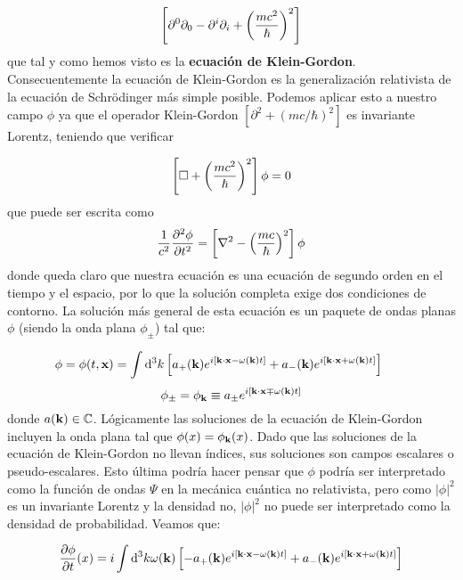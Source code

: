 \begin{equation}
	\left[ \partial^0\partial_0 - \partial^i \partial_i+ \left( \frac{mc^2}{\hbar} \right)^2  \right]
\end{equation}
que tal y como hemos visto es la \textbf{ecuación de Klein-Gordon}. Consecuentemente la ecuación de Klein-Gordon es la generalización relativista de la ecuación de Schrödinger más simple posible. Podemos aplicar esto a nuestro campo $\phi$ ya que el operador Klein-Gordon $[\partial^2 + (mc/\hbar)^2]$ es invariante Lorentz, teniendo que verificar

\begin{equation}
	\left[ \square + \left( \frac{mc^2}{\hbar} \right)^2  \right] \phi = 0
\end{equation}
que puede ser escrita como
\begin{equation}
	\frac{1}{c^2} \frac{\partial ^2 \phi}{\partial t^2}  = \left[ \nabla^2 - \left( \frac{mc}{\hbar} \right)^2 \right]\phi
\end{equation}
donde queda claro que nuestra ecuación es una ecuación de segundo orden en el tiempo y el espacio, por lo que la solución completa exige dos condiciones de contorno. La solución más general de esta ecuación es un paquete de ondas planas $\phi$ (siendo la onda plana $\phi_\pm$) tal que:

\begin{equation}
	\phi = \phi(t,\mathbf{x}) = \int \mathrm{d}^3 k\left[  a_+(\mathbf{k}) e^{i[\mathbf{k} \cdot \mathbf{x} - \omega(\mathbf{k})t]} +a_-(\mathbf{k}) e^{i[\mathbf{k} \cdot \mathbf{x} + \omega(\mathbf{k})t]}  \right] \qquad 
\end{equation}
\begin{equation}
	\phi_\pm =	\phi_{\mathbf{k}} \equiv a_\pm e^{i[\mathbf{k} \cdot \mathbf{x} \mp \omega(\mathbf{k})t]} 
\end{equation}
donde $a(\mathbf{k}) \in \mathbb{C}$. Lógicamente las soluciones de la ecuación de Klein-Gordon incluyen la onda plana tal que $\phi(x)=\phi_{\mathbf{k}}(x)$. Dado que las soluciones de la ecuación de Klein-Gordon no llevan índices, sus soluciones son campos escalares o pseudo-escalares. Esto última podría hacer pensar que $\phi$ podría ser interpretado como la función de ondas $\Psi$ en la mecánica cuántica no relativista, pero como $|\phi|^2$ es un invariante Lorentz y la densidad no, $|\phi|^2$ no puede ser interpretado como la densidad de probabilidad. Veamos que: 

\begin{equation}
	\frac{\partial \phi}{\partial t} (x) = i \int \mathrm{d}^3 k \omega(\mathbf{k})\left[  -a_+(\mathbf{k}) e^{i[\mathbf{k} \cdot \mathbf{x} - \omega(\mathbf{k})t]} +a_-(\mathbf{k}) e^{i[\mathbf{k} \cdot \mathbf{x} + \omega(\mathbf{k})t]} \right]  
\end{equation}

